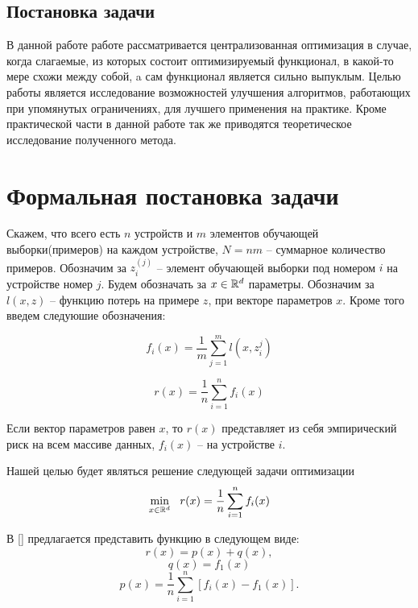 \documentclass[a4paper,12pt]{extarticle}
\begin{document}
\subsection{Постановка задачи}
В данной работе работе рассматривается централизованная оптимизация в случае, когда слагаемые,
из которых состоит оптимизируемый функционал, в какой-то мере схожи между собой,
a сам функционал является сильно выпуклым.
Целью работы является исследование возможностей улучшения алгоритмов, работающих при упомянутых
ограничениях, для лучшего применения на практике. Кроме практической части в данной работе 
так же приводятся теоретическое исследование полученного метода.

\section{Формальная постановка задачи}

Скажем, что всего есть $n$ устройств и $m$ элементов обучающей выборки(примеров) на каждом устройстве, $N = nm$ -- суммарное количество примеров.
Обозначим за $z_i^{(j)}$ -- элемент обучающей выборки под номером $i$ на устройстве номер $j$. Будем обозначать за $x\in\mathbb{R}^d$ параметры.
Обозначим за  $l(x, z)$ -- функцию потерь на примере $z$, при векторе параметров $x$. Кроме того введем следуюшие обозначения:

\begin{equation}
    \label{eq:f_i}
         f_i(x) = \frac{1}{m} \sum_{j=1}^{m} l(x, z_i^j)
\end{equation}

\begin{equation}
    \label{eq:F}
         r(x) = \frac{1}{n} \sum_{i=1}^{n} f_i(x)
\end{equation}

Если вектор параметров равен $x$, то $r(x)$ представляет из себя эмпирический риск на всем массиве данных, 
$f_i(x)$ -- на устройстве $i$.


Нашей целью будет являться решение следующей задачи оптимизации
\begin{equation}
    \label{eq:opt_x}
         \min_{x\in\mathbb{R}^d}~~ r(x) = \frac{1}{n} \sum_{i=1}^{n} f_i(x)
\end{equation}


В [] предлагается представить функцию в следующем виде: 
\begin{equation}
    \label{eq:rpq}
         r(x) = p(x) + q(x), 
\end{equation}
\begin{equation}
    \label{eq:q}
         q(x) = f_1(x)
\end{equation}
\begin{equation}
    \label{eq:p}
         p(x) = \frac{1}{n}\sum_{i = 1}^{n} \left[f_i(x) - f_1(x)\right].
\end{equation}
\end{document}
